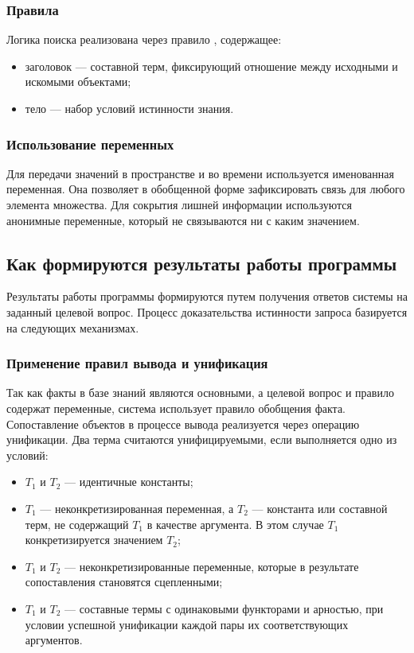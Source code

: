 \subsubsection{Правила}
Логика поиска реализована через правило , содержащее:
\begin{itemize}
    \item заголовок --- составной терм, фиксирующий отношение между исходными и искомыми объектами;
    \item тело --- набор условий истинности знания.
\end{itemize}

\subsubsection{Использование переменных}
Для передачи значений в пространстве и во времени используется именованная переменная. Она позволяет 
в обобщенной форме зафиксировать связь для любого элемента множества.
Для сокрытия лишней информации используются анонимные переменные, который не связываются ни с каким 
значением.

\subsection{Как формируются результаты работы программы}
Результаты работы программы формируются путем получения ответов системы на заданный 
целевой вопрос. Процесс доказательства истинности запроса базируется на следующих механизмах.

\subsubsection{Применение правил вывода и унификация}
Так как факты в базе знаний являются основными, а целевой вопрос и правило 
 содержат переменные, система использует правило обобщения факта. 
Сопоставление объектов в процессе вывода реализуется через операцию унификации. 
Два терма считаются унифицируемыми, если выполняется одно из условий:
\begin{itemize}
    \item $T_1$ и $T_2$ --- идентичные константы;
    \item $T_1$ --- неконкретизированная переменная, а $T_2$ --- константа 
    или составной терм, не содержащий $T_1$ в качестве аргумента. В этом случае 
    $T_1$ конкретизируется значением $T_2$;
    \item $T_1$ и $T_2$ --- неконкретизированные переменные, которые в результате 
    сопоставления становятся сцепленными;
    \item $T_1$ и $T_2$ --- составные термы с одинаковыми функторами и 
    арностью, при условии успешной унификации каждой пары их соответствующих аргументов.
\end{itemize}

